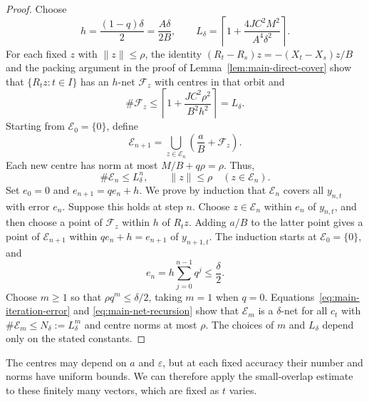 \documentclass[12pt,reqno,tbtags]{amsart}
\newcommand\norm[1]{\|#1\|}
\newcommand\1{\mathbbm{1}}
\newcommand{\eps}{\varepsilon}
\begin{document}
\begin{proof}
Choose
\begin{equation}\label{eq:main-net-precision}
    h=\frac{(1-q)\delta}{2}=\frac{A\delta}{2B},
    \qquad
    L_\delta=\left\lceil1+\frac{4JC^2M^2}{A^4\delta^2}\right\rceil.
\end{equation}
For each fixed $z$ with $\norm{z}\le\rho$, the identity
$(R_t-R_s)z=-(X_t-X_s)z/B$ and the packing argument in the proof of
Lemma~\ref{lem:main-direct-cover} show that
$\{R_tz:t\in I\}$ has an $h$-net $\mathcal F_z$ with centres in that orbit and
\begin{equation*}
    \#\mathcal F_z
    \le\left\lceil1+\frac{JC^2\rho^2}{B^2h^2}\right\rceil
    =L_\delta.
\end{equation*}
Starting from $\mathcal E_0=\{0\}$, define
\begin{equation*}
    \mathcal E_{n+1}
    =\bigcup_{z\in\mathcal E_n}\left(\frac aB+\mathcal F_z\right).
\end{equation*}
Each new centre has norm at most $M/B+q\rho=\rho$. Thus,
\begin{equation}\label{eq:main-net-recursion}
    \#\mathcal E_n\le L_\delta^n,
    \qquad\norm{z}\le\rho\quad(z\in\mathcal E_n).
\end{equation}
Set $e_0=0$ and $e_{n+1}=qe_n+h$. We prove by induction that $\mathcal E_n$
covers all $y_{n,t}$ with error $e_n$. Suppose this holds at step $n$.
Choose $z\in\mathcal E_n$ within $e_n$ of $y_{n,t}$, and then choose a point
of $\mathcal F_z$ within $h$ of $R_tz$. Adding $a/B$ to the latter point gives
a point of $\mathcal E_{n+1}$ within $qe_n+h=e_{n+1}$ of $y_{n+1,t}$.
The induction starts at $\mathcal E_0=\{0\}$, and
\begin{equation*}
    e_n=h\sum_{j=0}^{n-1}q^j\le\frac\delta2.
\end{equation*}
Choose $m\ge1$ so that $\rho q^m\le\delta/2$, taking $m=1$ when $q=0$.
Equations~\eqref{eq:main-iteration-error} and \eqref{eq:main-net-recursion}
show that $\mathcal E_m$ is a $\delta$-net for all $c_t$ with
$\#\mathcal E_m\le N_\delta:=L_\delta^m$ and centre norms at most $\rho$.
The choices of $m$ and $L_\delta$ depend only on the stated constants.
\end{proof}

The centres may depend on $a$ and $\eps$, but at each fixed accuracy their
number and norms have uniform bounds. We can therefore apply the
small-overlap estimate to these finitely many vectors, which are fixed as
$t$ varies.
\end{document}
